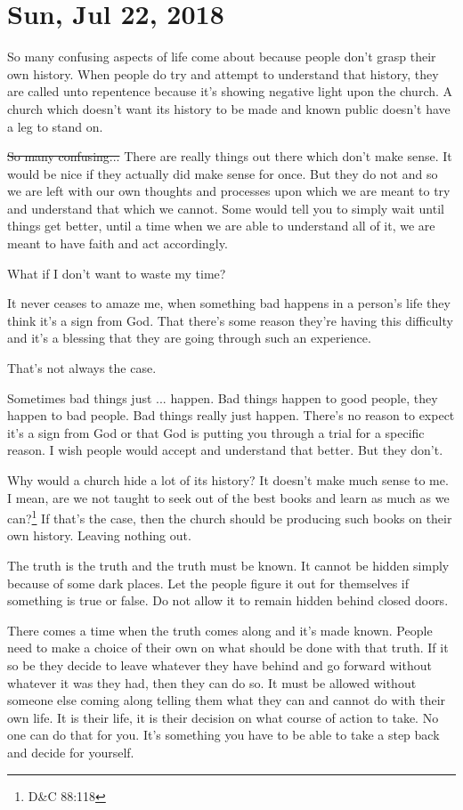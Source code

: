 \section{Sun, Jul 22, 2018}

So many confusing aspects of life come about because people don't grasp their own
history. When people do try and attempt to understand that history, they are called
unto repentence because it's showing negative light upon the church. A church which
doesn't want its history to be made and known public doesn't have a leg to stand on.

\st{So many confusing...} There are really things out there which don't make sense.
It would be nice if they actually did make sense for once. But they do not and so we
are left with our own thoughts and processes upon which we are meant to try and
understand that which we cannot. Some would tell you to simply wait until things get
better, until a time when we are able to understand all of it, we are meant to have
faith and act accordingly.

What if I don't want to waste my time?

It never ceases to amaze me, when something bad happens in a person's life they think
it's a sign from God. That there's some reason they're having this difficulty and
it's a blessing that they are going through such an experience.

That's not always the case.

Sometimes bad things just ... happen. Bad things happen to good people, they happen
to bad people. Bad things really just happen. There's no reason to expect it's a sign
from God or that God is putting you through a trial for a specific reason. I wish
people would accept and understand that better. But they don't.

Why would a church hide a lot of its history? It doesn't make much sense to me. I
mean, are we not taught to seek out of the best books and learn as much as we 
can?\footnote{D\&C 88:118} If that's the case, then the church should be producing 
such books on their own history. Leaving nothing out.

The truth is the truth and the truth must be known. It cannot be
hidden simply because of some dark places. Let the people figure it out for
themselves if something is true or false. Do not allow it to remain hidden behind
closed doors.

There comes a time when the truth comes along and it's made known. People need to
make a choice of their own on what should be done with that truth. If it so be they
decide to leave whatever they have behind and go forward without whatever it was they
had, then they can do so. It must be allowed without someone else coming along
telling them what they can and cannot do with their own life. It is their life, it is
their decision on what course of action to take. No one can do that for you. It's
something you have to be able to take a step back and decide for yourself.